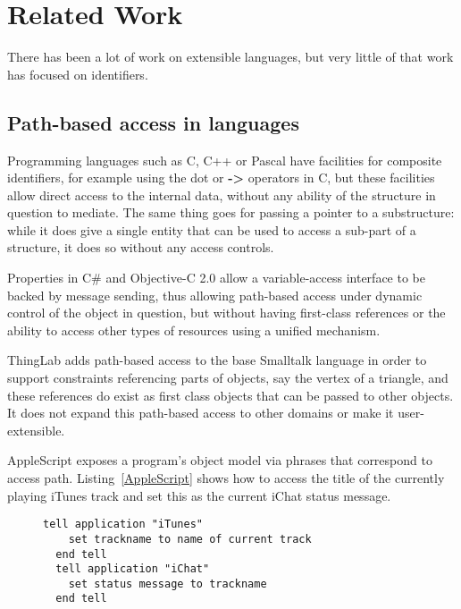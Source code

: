 \documentclass[preprint,authoryear]{llncs}
\begin{document}


\section{Related Work}
\label{related-work}

There has been a lot of work on extensible languages, but very little of that work 
has focused on identifiers.  

\subsection{Path-based access in languages}

Programming languages such as C, C++ or Pascal have facilities for composite
identifiers, for example using the dot or {\bf -> } operators in C, but these facilities allow
direct access to the internal data, without any ability of the structure in question to 
mediate.  The same thing goes for passing a pointer to a substructure:  while it
does give a single entity that can be used to access a sub-part of a structure, it
does so without any access controls.

Properties in C\# and Objective-C 2.0 allow a variable-access interface to be backed by 
message sending, thus allowing path-based access under dynamic control of the object
in question, but without having first-class references or the ability to access other
types of resources using a unified mechanism.

ThingLab\cite{thinglab}  adds path-based access to the base Smalltalk language in order to support
constraints referencing parts of objects, say the vertex of a triangle, and these
references do exist as first class objects that can be passed to other objects.
   It does not
expand this path-based access to other domains or make it user-extensible.

AppleScript\cite{applescript-hopl3} exposes a program's object model via
phrases that correspond to access path.  Listing~\ref{AppleScript} shows 
how to access the title of the currently playing iTunes track and set this
as the current iChat status message.

\begin{figure}[htbp]
\begin{lstlisting}[style=L,label= AppleScript,caption=Using AppleScript to set chat status from track name.]
  tell application "iTunes"
    set trackname to name of current track
  end tell
  tell application "iChat"
    set status message to trackname
  end tell
\end{lstlisting}
\end{figure}
\end{document}
